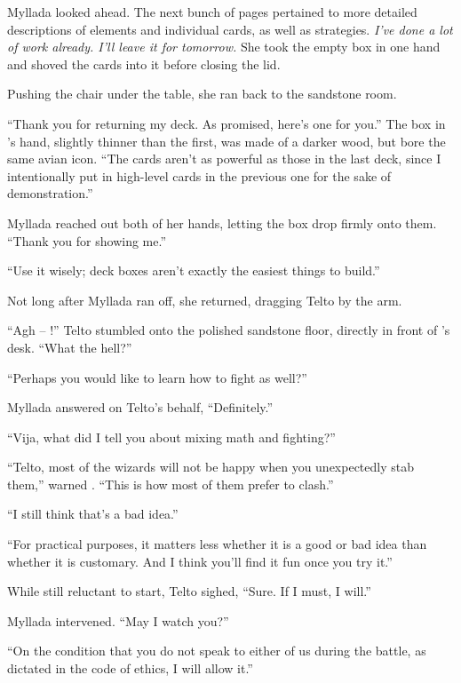Myllada looked ahead. The next bunch of pages pertained to more detailed descriptions of elements and individual cards, as well as strategies. \emph{I've done a lot of work already. I'll leave it for tomorrow.} She took the empty box in one hand and shoved the cards into it before closing the lid.

Pushing the chair under the table, she ran back to the sandstone room.

\centeredstars

``Thank you for returning my deck. As promised, here's one for you.'' The box in \yronsyncra's hand, slightly thinner than the first, was made of a darker wood, but bore the same avian icon. ``The cards aren't as powerful as those in the last deck, since I intentionally put in high-level cards in the previous one for the sake of demonstration.''

Myllada reached out both of her hands, letting the box drop firmly onto them. ``Thank you for showing me.''

``Use it wisely; deck boxes aren't exactly the easiest things to build.''

Not long after Myllada ran off, she returned, dragging Telto by the arm.

``Agh -- !'' Telto stumbled onto the polished sandstone floor, directly in front of \yronsyncra's desk. ``What the hell?''

``Perhaps you would like to learn how to fight as well?''

Myllada answered on Telto's behalf, ``Definitely.''

``Vija, what did I tell you about mixing math and fighting?''

``Telto, most of the wizards will not be happy when you unexpectedly stab them,'' warned \yronsyncra. ``This is how most of them prefer to clash.''

``I still think that's a bad idea.''

``For practical purposes, it matters less whether it is a good or bad idea than whether it is customary. And I think you'll find it fun once you try it.''

While still reluctant to start, Telto sighed, ``Sure. If I must, I will.''

Myllada intervened. ``May I watch you?''

``On the condition that you do not speak to either of us during the battle, as dictated in the code of ethics, I will allow it.''

\centeredstars


